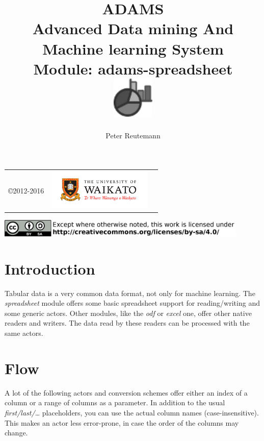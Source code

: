 \documentclass[a4paper]{book}
\title{
  \textbf{ADAMS} \\
  {\Large \textbf{A}dvanced \textbf{D}ata mining \textbf{A}nd \textbf{M}achine
  learning \textbf{S}ystem} \\
  {\Large Module: adams-spreadsheet} \\
  \vspace{1cm}
  \includegraphics[width=2cm]{images/spreadsheet-module.png} \\
}
\author{
  Peter Reutemann
}
\begin{document}
\begin{titlepage}
\maketitle

\thispagestyle{empty}
\center
\begin{table}[b]
	\begin{tabular}{c l l}
		\parbox[c][2cm]{2cm}{\copyright 2012-2016} &
		\parbox[c][2cm]{5cm}{\includegraphics[width=5cm]{images/coat_of_arms.pdf}} \\
	\end{tabular}
	\includegraphics[width=12cm]{images/cc.png} \\
\end{table}

\end{titlepage}

\tableofcontents
\listoffigures


\chapter{Introduction}
Tabular data is a very common data format, not only for machine learning.
The \textit{spreadsheet} module offers some basic spreadsheet support for
reading/writing and some generic actors. Other modules, like the \textit{odf}
or \textit{excel} one, offer other native readers and writers. The data
read by these readers can be processed with the same actors.


\chapter{Flow}
A lot of the following actors and conversion schemes offer either an index of
a column or a range of columns as a parameter. In addition to the usual
\textit{first/last/\ldots} placeholders, you can use the actual column names
(case-insensitive). This makes an actor less error-prone, in case the order 
of the columns may change.
\end{document}
